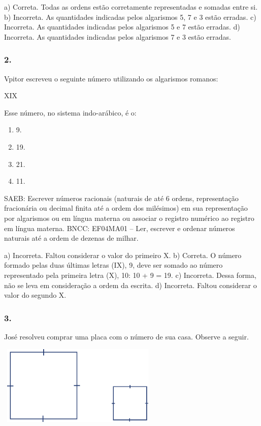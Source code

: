 \begin{enumerate}
a) Correta. Todas as ordens estão corretamente representadas e somadas entre si.
b) Incorreta. As quantidades indicadas pelos algarismos 5, 7 e 3 estão erradas.
c) Incorreta. As quantidades indicadas pelos algarismos 5 e 7 estão erradas.
d) Incorreta. As quantidades indicadas pelos algarismos 7 e 3 estão erradas.


\subsubsection{2.}\label{section-11}

Vpitor escreveu o seguinte número utilizando os algarismos romanos:

XIX

Esse número, no sistema indo-arábico, é o:

\begin{enumerate}
\def\labelenumi{\alph{enumi})}
\item
  9.
\item
  19.
\item
  21.
\item
  11.
\end{enumerate}

SAEB: Escrever números racionais (naturais de até 6 ordens, representação fracionária ou decimal finita até a ordem dos milésimos) em sua representação por algarismos ou em língua materna ou associar o registro numérico ao registro em língua materna.
BNCC: EF04MA01 -- Ler, escrever e ordenar números naturais até a ordem de dezenas de milhar.

a)  Incorreta. Faltou considerar o valor do primeiro X.
b)  Correta. O número formado pelas duas últimas letras (IX), 9, deve ser somado ao número representado pela primeira letra (X), 10: 10 + 9 = 19.
c)  Incorreta. Dessa forma, não se leva em consideração a ordem da escrita.
d)  Incorreta. Faltou considerar o valor do segundo X.


\subsubsection{3.}\label{section-12}

José resolveu comprar uma placa com o número de sua casa. Observe a seguir.

\includegraphics[width=3.02500in,height=1.48973in]{media/image26.png}


\end{enumerate}
